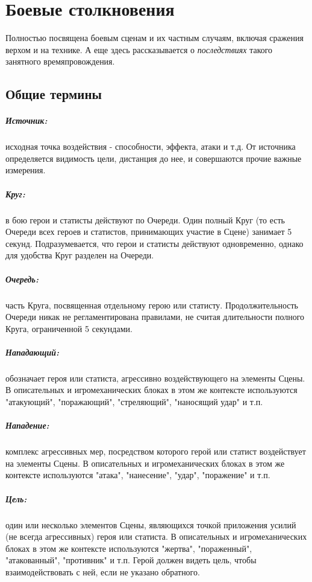 \chapter{Боевые столкновения}
Полностью посвящена боевым сценам и их частным случаям, включая сражения верхом и на технике. А еще здесь рассказывается о \textit{последствиях} такого занятного времяпровождения.
\section{Общие термины}

\paragraph{Источник:} исходная точка воздействия - способности, эффекта, атаки и т.д. От источника определяется видимость цели, дистанция до нее, и совершаются прочие важные измерения. 
\paragraph{Круг:} в бою герои и статисты действуют по Очереди. Один полный Круг (то есть Очереди всех героев и статистов, принимающих участие в Сцене) занимает 5 секунд. Подразумевается, что герои и статисты действуют одновременно, однако для удобства Круг разделен на Очереди. 
\paragraph{Очередь:} часть Круга, посвященная отдельному герою или статисту. Продолжительность Очереди никак не регламентирована правилами, не считая длительности полного Круга, ограниченной 5 секундами.
\paragraph{Нападающий:} обозначает героя или статиста, агрессивно воздействующего на элементы Сцены. В описательных и игромеханических блоках в этом же контексте используются "атакующий", "поражающий", "стреляющий", "наносящий удар" и т.п.
\paragraph{Нападение:} комплекс агрессивных мер, посредством которого герой или статист воздействует на элементы Сцены. В описательных и игромеханических блоках в этом же контексте используются "атака", "нанесение", "удар", "поражение" и т.п.
\paragraph{Цель:} один или несколько элементов Сцены, являющихся точкой приложения усилий (не всегда агрессивных) героя или статиста. В описательных и игромеханических блоках в этом же контексте используются "жертва", "пораженный", "атакованный", "противник" и т.п. Герой должен видеть цель, чтобы взаимодействовать с ней, если не указано обратного.
